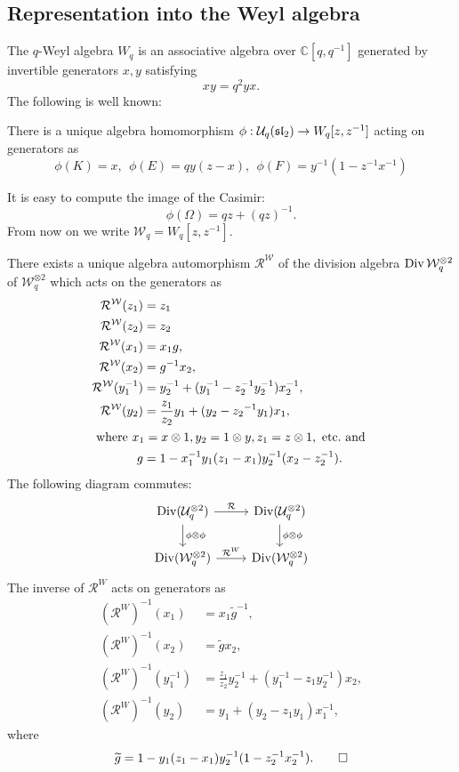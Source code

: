 \documentclass{sl2ams}
\numberwithin{equation}{section}
\newcommand{\CC}{\mathbb{C}}
\newcommand{\U}{\mathcal{U}}
\newcommand{\W}{\mathcal{W}}
\newcommand{\R}{\mathcal{R}}
\begin{document}
\subsection{Representation into the Weyl algebra}

The $q$-Weyl algebra $W_q$ is an associative algebra over $\CC[q, q^{-1}]$ generated by invertible generators $x,y$ satisfying
  \[
    xy = q^2 yx.
  \]
The following is well known:
\begin{proposition}
  There is a unique algebra homomorphism $\phi : \U_q(\sla) \to W_q[z,z^{-1}]$ acting on generators as 
  \[
    \phi(K)=x, \ \ \phi(E)=qy(z-x), \ \ \phi(F)=y^{-1}(1-z^{-1}x^{-1})
  \]
\end{proposition}
It is easy to compute the image of the Casimir:
\[
  \phi(\Omega) = qz + (qz)^{-1}.
\]
From now on we write \(\W_q = W_q[z, z^{-1}]\).
\begin{proposition}
  \label{thm:R-action-on-weyl}
  There exists a unique algebra automorphism $\R^\W$ of the division algebra $\Div{\W_q^{\otimes 2}}$ of $\W_q^{\otimes 2}$ which acts on the generators as 
  \begin{align*}
    \R^\W(z_1)&=z_1 \\
    \R^\W(z_2)&=z_2 \\
    \R^\W(x_1)&=x_1g, \\
    \R^\W(x_2)&=g^{-1}x_2, \\
    \R^\W(y_1^{-1})&=y_2^{-1}+(y_1^{-1}-z_2^{-1}y_2^{-1})x_2^{-1}, \\
    \R^\W(y_2)&=\frac{z_1}{z_2}y_1+(y_2-{z_2}^{-1}y_1)x_1, \\
    \intertext{
    where
    \(
    x_1 = x \otimes 1, y_2 = 1 \otimes y, z_1 = z \otimes 1, \text{ etc.\ and} 
    \)
  }
    g&=1-x_1^{-1}y_1(z_1-x_1)y_2^{-1}(x_2-z_2^{-1}).
  \end{align*}
  The following diagram commutes:
  \begin{equation}
    \label{eq:automorphism-pullback}
    \begin{tikzcd}
     \Div(\U_q^{\otimes 2}) \arrow[r, "\R"] \arrow[d, "\phi \otimes \phi"] & \Div(\U_q^{\otimes 2}) \arrow[d, "\phi \otimes \phi"] \\
      \Div(\W_q^{\otimes 2}) \arrow[r, "\R^W"] & \Div(\W_q^{\otimes 2})
    \end{tikzcd}
  \end{equation}
  The inverse of $\R^W$ acts on generators as
  \begin{align*}
    (\R^W)^{-1}(x_1)&=x_1\widetilde{g}^{-1}, \\
    (\R^W)^{-1}(x_2)&=\widetilde{g}x_2, \\
    (\R^W)^{-1}(y_1^{-1})&=\frac{z_1}{z_2}y_2^{-1} + (y_1^{-1}-{z_1}y_2^{-1})x_2,\\
    (\R^W)^{-1}(y_2)&=y_1 + (y_2 - {z_1}y_1)x_1^{-1},
  \end{align*}
  where 
  \[
    \widetilde{g}= 1 - y_1 (z_1 - x_1) y_2^{-1} (1 - z_2^{-1} x_2^{-1}).\qedhere
  \]
\end{proposition}
\end{document}
